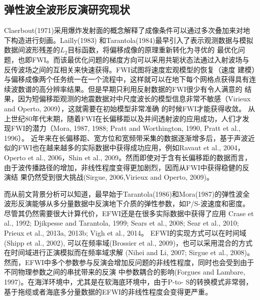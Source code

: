 \subsection{弹性波全波形反演研究现状}
Claerbout(1971\cite{Claerbout1971})采用爆炸发射面的概念解释了成像条件可以通过多次叠加来对地下构造进行刻画。Lailly(1983\cite{lailly1983seismic})
和Tarantola(1984\cite{tarantola1984})最早引入了表示观测数据与模拟数据间波形残差的$L_2$目标函数，将偏移成像的原理重新转化为寻优的
最优化问题，也即FWI。而该最优化问题的梯度方向可以采用共轭状态法通过入射波场与反传波场之间的互相关来快速获得。FWI试图将速度宏观模型的恢复（速度
建模）与偏移成像两个任务统一在一个流程中，这样就可以在地下每个网格点获得具有连续波数谱的高分辨率结果。但是早期只利用反射数据的FWI很少有令人满意的
结果，因为短偏移距观测的地震数据对中尺度波长的模型信息非常不敏感（Virieux and Operto, 2009\cite{virieux2009overview}），这就需要在初始模型非常准确
的时候FWI才能获得收敛。
从上世纪80年代末期，随着FWI在长偏移距以及井间透射波的应用成功，人们才发现FWI的潜力（Mora, 1987\cite{mora:1987}, 1988\cite{mora1988elastic}; Pratt
and Worthington, 1990\cite{PRATTEtAl1990}, Pratt et al., 1996\cite{pratt1996two}）。
近年来在长偏移距、宽方位和宽频带采集的数据逐渐增多后，基于声波近似的FWI也在越来越多的实际数据中获得成功应用，例如Ravaut
et al., 2004\cite{RavautEtAl2004}，Operto et al., 2006\cite{Operto2006}，Shin et al.,
2009\cite{ShinEtAl2009}。然而即使对于含有长偏移距的数据而言，由于波传播路径的增加，非线性程度变得更加剧烈，因而从FWI中获得稳健的反演结
果仍然受到很大挑战(Sirgue, 2006\cite{sirgue2006importance},Virieux and Operto,
2009\cite{virieux2009overview})。

而从前文背景分析可以知道，最早始于Tarantola(1986)\cite{tarantola:1986}和Mora(1987)\cite{mora:1987}的弹性波全波形反演能够从多分量数据中反演地下介质的弹性参数，如P/S-波速度和密度。
尽管其仍然需要很大计算代价，EFWI还是在很多实际数据中获得了应用
Crase et al., 1992\cite{crase1992nonlinear}; Djikpesse and Tarantola,
1999\cite{djikpesse.tarantola:1999}; Sears et al., 2008\cite{sears2008}; Sear et al.,
2010\cite{sears:2010}; Prieux et al., 2013a\cite{prieux:2013a}, 2013b\cite{prieux:2013b}; Vigh et al.,
2014\cite{vigh:2014}。
EFWI的实现方式可以在时间域(Shipp et al., 2002\cite{shipp:2002}),
可以在频率域(Brossier et al., 2009\cite{brossier2009})，也可以采用混合的方式在时间域进行正演模拟而在频率域求解
(Nihei and Li, 2007\cite{nihei.li:2007}; Sirgue et al.,
2008\cite{sirgue:2008})。然而，EFWI中多个参数参与反演会增加反问题的非线性程度，同时也会受到由于不同物理参数之间的串扰带来的反演
中参数耦合的影响(Forgues and Lambare, 1997\cite{forgues.lambare:1997})。在海洋环境中，尤其是在软海底环境中，由于P-to-
S的转换模式非常弱，基于拖缆或者海底多分量数据的EFWI的非线性程度会变得更严重\cite{sears2008}。

